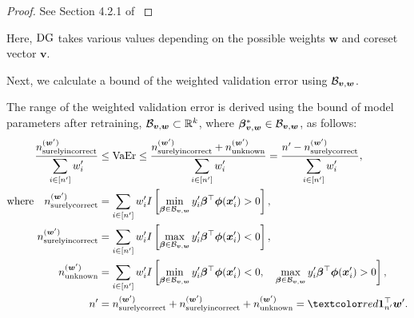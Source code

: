 \begin{proof}
	See Section 4.2.1 of \citep{10.1162/neco_a_01619}
\end{proof}
%
Here, ${\rm DG}$ takes various values depending on the possible weights $\bm w$ and coreset vector $\bm v$.
%

Next, we calculate a bound of the weighted validation error using ${\cal B}_{\bm{v}, \bm{w}}$.
\begin{theorem} \label{thm:acc-lb}
	The range of the weighted validation error is derived using the bound of model parameters after retraining, ${\cal B}_{\bm{v}, \bm{w}} \subset \mathbb{R}^k$, where $\bm{\beta}_{\bm v, \bm w} ^{*} \in {\cal B}_{\bm{v}, \bm{w}}$, as follows:
	\begin{align}
		\displaystyle\frac{n_{\rm surelyincorrect}^{(\bm w')}}{\displaystyle \sum_{i \in\left[n^ \prime \right]} w_i'} & \leq {\rm VaEr} \leq \frac{n_{\rm surelyincorrect}^{(\bm w')} + {n_\mathrm{unknown}^{(\bm w')}}}{\displaystyle \sum_{i \in\left[n^ \prime \right]} w_i'} = \frac{n^\prime - {n_{\rm surelycorrect}^{(\bm w')}}}{\displaystyle \sum_{i \in\left[n^ \prime \right]} w_i'}, \label{eq:error-bound}\\
		\text{where} \quad n_{\rm surelycorrect}^{(\bm w')} & = \sum_{i \in\left[n^ \prime \right]} w_i' I\left[\min_{\bm{\beta} \in {\cal B}_{\bm{v}, \bm{w}}} y_i^{\prime} \bm{\beta}^\top \bm\phi(\bm x^{\prime}_{i}) > 0\right], \label{eq:correct-bound}\\
		n_{\rm surelyincorrect}^{(\bm w')} & = \sum_{i \in\left[n^ \prime \right]} w_i' I\left[\max_{\bm{\beta} \in {\cal B}_{\bm{v}, \bm{w}}} y_i^{\prime} \bm{\beta}^\top \bm\phi(\bm x^{\prime}_{i}) < 0\right], \label{eq:incorrect-bound}\\
		n_\mathrm{unknown}^{(\bm w')} & = \sum_{i \in\left[n^ \prime \right]} w_i' I\left[\min_{\bm{\beta} \in {\cal B}_{\bm{v}, \bm{w}}} y_i^{\prime} \bm{\beta}^\top \bm\phi(\bm x^{\prime}_{i}) < 0, \quad \max_{\bm{\beta} \in {\cal B}_{\bm{v}, \bm{w}}} y_i^{\prime} \bm{\beta}^\top \bm\phi(\bm x^{\prime}_{i}) > 0\right], \label{eq:unknown-bound}\\
		n^\prime & = n_{\rm surelycorrect}^{(\bm w')} + n_{\rm surelyincorrect}^{(\bm w')} + n_{\rm unknown}^{(\bm w')} =
		\red{\bm 1_{n ^\prime}^\top \bm w'}.
		\label{eq:n-all}
	\end{align}
\end{theorem}
